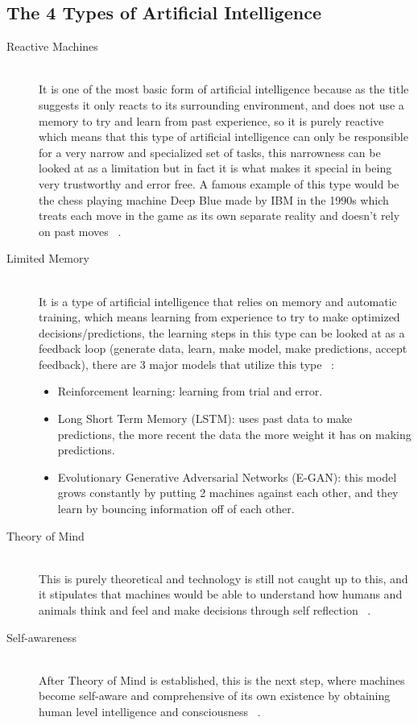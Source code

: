    \subsection{The 4 Types of Artificial Intelligence}
        \begin{description} 
        \item[Reactive Machines] \hfill \\
            It is one of the most basic form of artificial intelligence because as the title suggests it only reacts to its surrounding environment, and does not use a memory to try and learn from past experience, so it is purely reactive which means that this type of artificial intelligence can only be responsible for a very narrow and specialized set of tasks, this narrowness can be looked at as a limitation but in fact it is what makes it special in being very trustworthy and error free. A famous example of this type would be the chess playing machine Deep Blue made by IBM in the 1990s which treats each move in the game as its own separate reality and doesn't rely on past moves ~\cite{ai}.
        \item[Limited Memory] \hfill \\
            It is a type of artificial intelligence that relies on memory and automatic training, which means learning from experience to try to make optimized decisions/predictions, the learning steps in this type can be looked at as a feedback loop (generate data, learn, make model, make predictions, accept feedback), there are 3 major models that utilize this type ~\cite{ai}: 
            \begin{itemize}
                \item Reinforcement learning: learning from trial and error.
                \item Long Short Term Memory (LSTM):  uses past data to make predictions, the more recent the data the more weight it has on making predictions.
                \item Evolutionary Generative Adversarial Networks (E-GAN):  this model grows constantly by putting 2 machines against each other, and they learn by bouncing information off of each other. 
            \end{itemize}
        \item[Theory of Mind] \hfill \\
            This is purely theoretical and technology is still not caught up to this, and it stipulates that machines would be able to understand how humans and animals think and feel and make decisions through self reflection ~\cite{ai}.
        \item[Self-awareness] \hfill \\
            After Theory of Mind is established, this is the next step, where machines become self-aware and comprehensive of its own existence by obtaining human level intelligence and consciousness ~\cite{ai}.
        \end{description}
    
